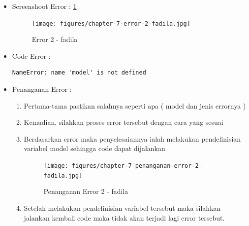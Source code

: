 \begin{enumerate}
\begin{itemize}
\item Screenshoot Error 	: \ref{chapter-7-error-2-fadila}
\par
\par
\begin{figure}[!hbtp]
\centering
\texttt{[image: figures/chapter-7-error-2-fadila.jpg]}
\caption{Error 2 - fadila}
\label{chapter-7-error-2-fadila}
\end{figure}
\par
\item Code Error		:
\begin{lstlisting}
NameError: name 'model' is not defined
\end{lstlisting}
\item Penanganan Error	:
\begin{enumerate}
\item Pertama-tama pastikan salahnya seperti apa ( model dan jenis errornya )
\item Kemudian, silahkan proses error tersebut dengan cara yang sesuai
\item Berdasarkan error maka penyelesaiannya ialah melakukan pendefinisian variabel model sehingga code dapat dijalankan
\par
\begin{figure}[!hbtp]
\centering
\texttt{[image: figures/chapter-7-penanganan-error-2-fadila.jpg]}
\caption{Penanganan Error 2 - fadila}
\label{chapter-7-penanganan-error-2-fadila}
\end{figure}
\par
\item Setelah melakukan pendefinisian variabel tersebut maka silahkan jalankan kembali code maka tidak akan terjadi lagi error tersebut.
\end{enumerate}
\end{itemize}
\end{enumerate}
\par
\par